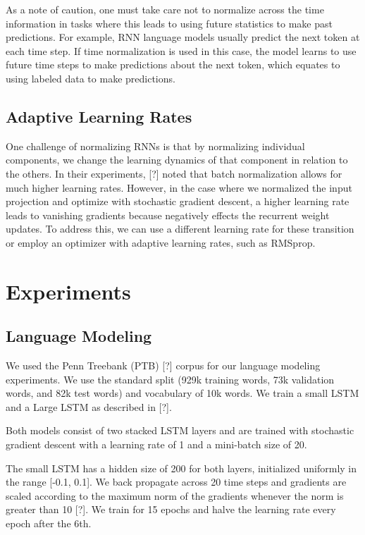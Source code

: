 \documentclass{article}
\begin{document}
As a note of caution, one must take care not to normalize across the time information in tasks where this leads to using future statistics to make past predictions. For example, RNN language models usually predict the next token at each time step. If time normalization is used in this case, the model learns to use future time steps to make predictions about the next token, which equates to using labeled data to make predictions.

\subsection{Adaptive Learning Rates} One challenge of normalizing RNNs is that by normalizing individual components, we change the learning dynamics of that component in relation to the others. In their experiments, [?] noted that batch normalization allows for much higher learning rates. However, in the case where we normalized the input projection and optimize with stochastic gradient descent, a higher learning rate leads to vanishing gradients because negatively effects the recurrent weight updates. To address this, we can use a different learning rate for these transition or employ an optimizer with adaptive learning rates, such as RMSprop.


\section{Experiments}

\subsection{Language Modeling}
We used the Penn Treebank (PTB) [?] corpus for our language modeling experiments. We use the standard split (929k training words, 73k validation words, and 82k test words) and vocabulary of 10k words. We train a small LSTM and a Large LSTM as described in [?].

Both models consist of two stacked LSTM layers and are trained with stochastic gradient descent with a learning rate of 1 and a mini-batch size of 20.

The small LSTM has a hidden size of 200 for both layers, initialized uniformly in the range [-0.1, 0.1]. We back propagate across 20 time steps and gradients are scaled according to the maximum norm of the gradients whenever the norm is greater than 10 [?]. We train for 15 epochs and halve the learning rate every epoch after the 6th.  
\end{document}

